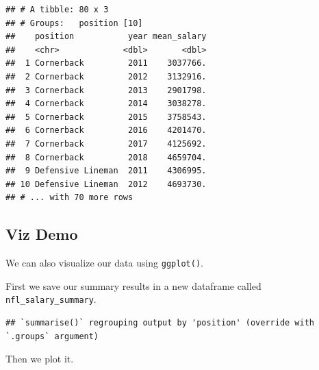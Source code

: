 \documentclass[
]{book}
\newenvironment{Shaded}{\begin{snugshade}}{\end{snugshade}}
\newcommand{\DataTypeTok}[1]{\textcolor[rgb]{0.13,0.29,0.53}{#1}}
\newcommand{\KeywordTok}[1]{\textcolor[rgb]{0.13,0.29,0.53}{\textbf{#1}}}
\newcommand{\NormalTok}[1]{#1}
\newcommand{\OperatorTok}[1]{\textcolor[rgb]{0.81,0.36,0.00}{\textbf{#1}}}
\newcommand{\StringTok}[1]{\textcolor[rgb]{0.31,0.60,0.02}{#1}}
\begin{document}
\begin{verbatim}
## # A tibble: 80 x 3
## # Groups:   position [10]
##    position           year mean_salary
##    <chr>             <dbl>       <dbl>
##  1 Cornerback         2011    3037766.
##  2 Cornerback         2012    3132916.
##  3 Cornerback         2013    2901798.
##  4 Cornerback         2014    3038278.
##  5 Cornerback         2015    3758543.
##  6 Cornerback         2016    4201470.
##  7 Cornerback         2017    4125692.
##  8 Cornerback         2018    4659704.
##  9 Defensive Lineman  2011    4306995.
## 10 Defensive Lineman  2012    4693730.
## # ... with 70 more rows
\end{verbatim}

\hypertarget{viz-demo}{%
\subsection{Viz Demo}\label{viz-demo}}

We can also visualize our data using \texttt{ggplot()}.

First we save our summary results in a new dataframe called \texttt{nfl\_salary\_summary}.

\begin{Shaded}
\end{Shaded}

\begin{verbatim}
## `summarise()` regrouping output by 'position' (override with `.groups` argument)
\end{verbatim}

Then we plot it.

\begin{Shaded}
\end{Shaded}
\end{document}
